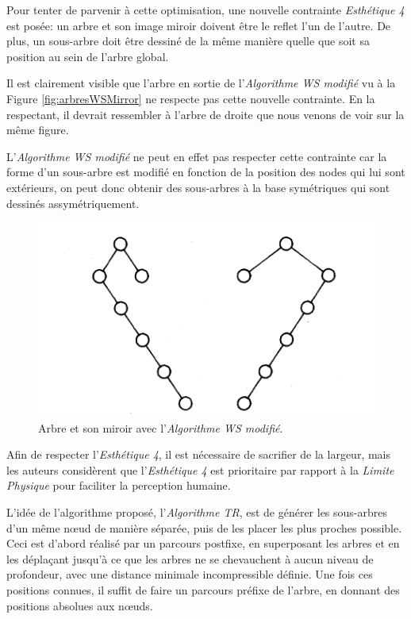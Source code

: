 \documentclass{article}
\begin{document}
  Pour tenter de parvenir à cette optimisation, une nouvelle contrainte \emph{Esthétique 4} est posée: un arbre et son image miroir doivent être le reflet l'un de l'autre. De plus, un sous-arbre doit être dessiné de la même manière quelle que soit sa position au sein de l'arbre global.

  Il est clairement visible que l'arbre en sortie de l'\emph{Algorithme WS modifié} vu à la Figure \ref{fig:arbresWSMirror} ne respecte pas cette nouvelle contrainte. En la respectant, il devrait ressembler à l'arbre de droite que nous venons de voir sur la même figure.
  
  L'\emph{Algorithme WS modifié} ne peut en effet pas respecter cette contrainte car la forme d'un sous-arbre est modifié en fonction de la position des nodes qui lui sont extérieurs, on peut donc obtenir des sous-arbres à la base symétriques qui sont dessinés assymétriquement.
  
  \vfill
  \begin{figure}[h]
    \begin{center}
        \includegraphics[scale=0.5]{comparArbreMiroirWS.png}
    \end{center}
    \caption{Arbre et son miroir avec l'\emph{Algorithme WS modifié}.
	\cite{article81}}
  \label{fig:arbresAlgoWS}
\end{figure}
\vfill

  Afin de respecter l'\emph{Esthétique 4}, il est nécessaire de sacrifier de la largeur, mais les auteurs considèrent que l'\emph{Esthétique 4} est prioritaire par rapport à la \emph{Limite Physique} pour faciliter la perception humaine.
  
  L'idée de l'algorithme proposé, l'\emph{Algorithme TR}, est de générer les sous-arbres d'un même n\oe{}ud de manière séparée, puis de les placer les plus proches possible.
  Ceci est d'abord réalisé par un parcours postfixe, en superposant les arbres et en les déplaçant jusqu'à ce que les arbres ne se chevauchent à aucun niveau de profondeur, avec une distance minimale incompressible définie. Une fois ces positions connues, il suffit de faire un parcours préfixe de l'arbre, en donnant des positions absolues aux n\oe{}uds.
  
\end{document}
